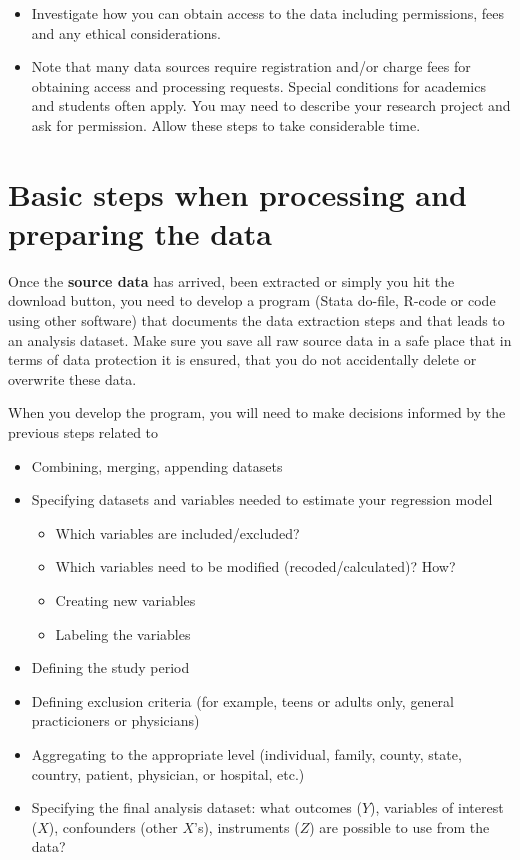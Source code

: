 \documentclass[
]{book}
\providecommand{\tightlist}{%
  \setlength{\itemsep}{0pt}\setlength{\parskip}{0pt}}
\begin{document}
\begin{itemize}
\tightlist
\item
  Investigate how you can obtain access to the data including
  permissions, fees and any ethical considerations.
\item
  Note that many data sources require registration and/or charge fees
  for obtaining access and processing requests. Special conditions for
  academics and students often apply. You may need to describe your
  research project and ask for permission. Allow these steps to take
  considerable time.
\end{itemize}

\hypertarget{basic-steps-when-processing-and-preparing-the-data}{%
\section{Basic steps when processing and preparing the
data}\label{basic-steps-when-processing-and-preparing-the-data}}

Once the \textbf{source data} has arrived, been extracted or simply you
hit the download button, you need to develop a program (Stata do-file,
R-code or code using other software) that documents the data extraction
steps and that leads to an analysis dataset. Make sure you save all raw
source data in a safe place that in terms of data protection it is
ensured, that you do not accidentally delete or overwrite these data.

When you develop the program, you will need to make decisions informed
by the previous steps related to

\begin{itemize}
\tightlist
\item
  Combining, merging, appending datasets
\item
  Specifying datasets and variables needed to estimate your regression
  model

  \begin{itemize}
  \tightlist
  \item
    Which variables are included/excluded?
  \item
    Which variables need to be modified (recoded/calculated)? How?
  \item
    Creating new variables
  \item
    Labeling the variables
  \end{itemize}
\item
  Defining the study period
\item
  Defining exclusion criteria (for example, teens or adults only,
  general practicioners or physicians)
\item
  Aggregating to the appropriate level (individual, family, county,
  state, country, patient, physician, or hospital, etc.)
\item
  Specifying the final analysis dataset: what outcomes (\(Y\)),
  variables of interest (\(X\)), confounders (other \(X\)'s),
  instruments (\(Z\)) are possible to use from the data?
\end{itemize}
\end{document}

